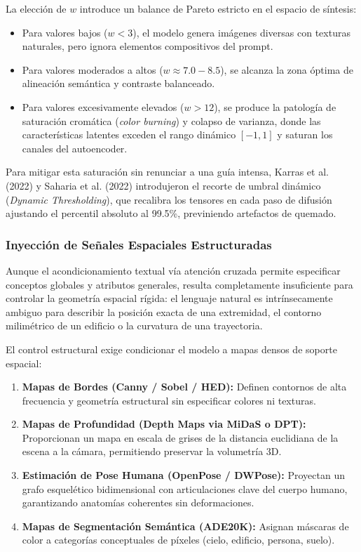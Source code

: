 La elección de $w$ introduce un balance de Pareto estricto en el espacio de síntesis:
\begin{itemize}
    \item Para valores bajos ($w < 3$), el modelo genera imágenes diversas con texturas naturales, pero ignora elementos compositivos del prompt.
    \item Para valores moderados a altos ($w \approx 7.0 - 8.5$), se alcanza la zona óptima de alineación semántica y contraste balanceado.
    \item Para valores excesivamente elevados ($w > 12$), se produce la patología de saturación cromática (\textit{color burning}) y colapso de varianza, donde las características latentes exceden el rango dinámico $[-1, 1]$ y saturan los canales del autoencoder.
\end{itemize}

Para mitigar esta saturación sin renunciar a una guía intensa, Karras et al. (2022) y Saharia et al. (2022) introdujeron el recorte de umbral dinámico (\textit{Dynamic Thresholding}), que recalibra los tensores en cada paso de difusión ajustando el percentil absoluto al 99.5\%, previniendo artefactos de quemado.

\subsubsection{Inyección de Señales Espaciales Estructuradas}

Aunque el acondicionamiento textual vía atención cruzada permite especificar conceptos globales y atributos generales, resulta completamente insuficiente para controlar la geometría espacial rígida: el lenguaje natural es intrínsecamente ambiguo para describir la posición exacta de una extremidad, el contorno milimétrico de un edificio o la curvatura de una trayectoria.

El control estructural exige condicionar el modelo a mapas densos de soporte espacial:
\begin{enumerate}
    \item \textbf{Mapas de Bordes (Canny / Sobel / HED):} Definen contornos de alta frecuencia y geometría estructural sin especificar colores ni texturas.
    \item \textbf{Mapas de Profundidad (Depth Maps via MiDaS o DPT):} Proporcionan un mapa en escala de grises de la distancia euclidiana de la escena a la cámara, permitiendo preservar la volumetría 3D.
    \item \textbf{Estimación de Pose Humana (OpenPose / DWPose):} Proyectan un grafo esquelético bidimensional con articulaciones clave del cuerpo humano, garantizando anatomías coherentes sin deformaciones.
    \item \textbf{Mapas de Segmentación Semántica (ADE20K):} Asignan máscaras de color a categorías conceptuales de píxeles (cielo, edificio, persona, suelo).
\end{enumerate}

